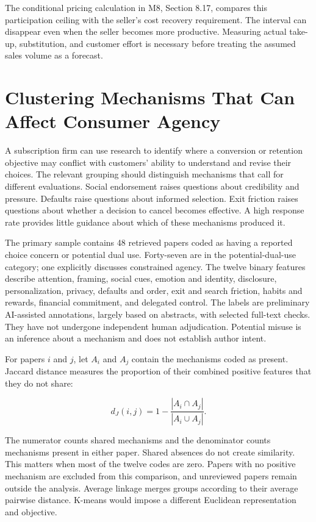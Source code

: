 The conditional pricing calculation in M8, Section 8.17, compares this
participation ceiling with the seller's cost recovery requirement. The
interval can disappear even when the seller becomes more productive.
Measuring actual take-up, substitution, and customer effort is necessary
before treating the assumed sales volume as a forecast.

\hypertarget{M04-clustering-mechanisms-that-can-affect-consumer-agency}{%
\section{Clustering Mechanisms That Can Affect Consumer
Agency}\label{M04-clustering-mechanisms-that-can-affect-consumer-agency}}

\noindent \noindent A subscription firm can use research to identify where a
conversion or retention objective may conflict with customers' ability
to understand and revise their choices. The relevant grouping should
distinguish mechanisms that call for different evaluations. Social
endorsement raises questions about credibility and pressure. Defaults
raise questions about informed selection. Exit friction raises questions
about whether a decision to cancel becomes effective. A high response
rate provides little guidance about which of these mechanisms produced
it.

The primary sample contains 48 retrieved papers coded as having a
reported choice concern or potential dual use. Forty-seven are in the
potential-dual-use category; one explicitly discusses constrained
agency. The twelve binary features describe attention, framing, social
cues, emotion and identity, disclosure, personalization, privacy,
defaults and order, exit and search friction, habits and rewards,
financial commitment, and delegated control. The labels are preliminary
AI-assisted annotations, largely based on abstracts, with selected
full-text checks. They have not undergone independent human
adjudication. Potential misuse is an inference about a mechanism and
does not establish author intent.

For papers \(i\) and \(j\), let \(A_i\) and \(A_j\) contain the
mechanisms coded as present. Jaccard distance measures the proportion of
their combined positive features that they do not share:

\[
d_J(i,j)=1-\frac{|A_i\cap A_j|}{|A_i\cup A_j|}.
\]

The numerator counts shared mechanisms and the denominator counts
mechanisms present in either paper. Shared absences do not create
similarity. This matters when most of the twelve codes are zero. Papers
with no positive mechanism are excluded from this comparison, and
unreviewed papers remain outside the analysis. Average linkage merges
groups according to their average pairwise distance. K-means would
impose a different Euclidean representation and objective.

